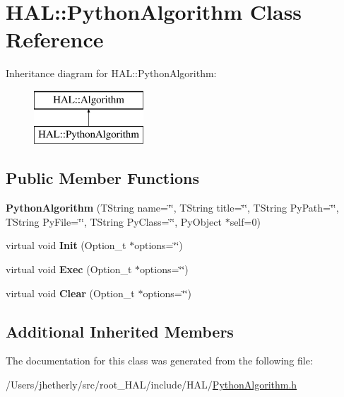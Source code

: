 \hypertarget{class_h_a_l_1_1_python_algorithm}{\section{H\-A\-L\-:\-:Python\-Algorithm Class Reference}
\label{class_h_a_l_1_1_python_algorithm}
}
Inheritance diagram for H\-A\-L\-:\-:Python\-Algorithm\-:\begin{figure}[H]
\begin{center}
\leavevmode
\includegraphics[height=2.000000cm]{class_h_a_l_1_1_python_algorithm}
\end{center}
\end{figure}
\subsection*{Public Member Functions}
\begin{DoxyCompactItemize}
\item 
\hypertarget{class_h_a_l_1_1_python_algorithm_a91ca9d7b2a002013b5dd27951aca3678}{{\bfseries Python\-Algorithm} (T\-String name=\char`\"{}\char`\"{}, T\-String title=\char`\"{}\char`\"{}, T\-String Py\-Path=\char`\"{}\char`\"{}, T\-String Py\-File=\char`\"{}\char`\"{}, T\-String Py\-Class=\char`\"{}\char`\"{}, Py\-Object $\ast$self=0)}\label{class_h_a_l_1_1_python_algorithm_a91ca9d7b2a002013b5dd27951aca3678}

\item 
\hypertarget{class_h_a_l_1_1_python_algorithm_a951c827d0f926b5096f7e59accc1e007}{virtual void {\bfseries Init} (Option\-\_\-t $\ast$options=\char`\"{}\char`\"{})}\label{class_h_a_l_1_1_python_algorithm_a951c827d0f926b5096f7e59accc1e007}

\item 
\hypertarget{class_h_a_l_1_1_python_algorithm_a64a70202dd5da390ab6654a7e33c5976}{virtual void {\bfseries Exec} (Option\-\_\-t $\ast$options=\char`\"{}\char`\"{})}\label{class_h_a_l_1_1_python_algorithm_a64a70202dd5da390ab6654a7e33c5976}

\item 
\hypertarget{class_h_a_l_1_1_python_algorithm_aac72e398eadd979cf62617fe2fbe1a01}{virtual void {\bfseries Clear} (Option\-\_\-t $\ast$options=\char`\"{}\char`\"{})}\label{class_h_a_l_1_1_python_algorithm_aac72e398eadd979cf62617fe2fbe1a01}

\end{DoxyCompactItemize}
\subsection*{Additional Inherited Members}


The documentation for this class was generated from the following file\-:\begin{DoxyCompactItemize}
\item 
/\-Users/jhetherly/src/root\-\_\-\-H\-A\-L/include/\-H\-A\-L/\hyperlink{_python_algorithm_8h}{Python\-Algorithm.\-h}\end{DoxyCompactItemize}
